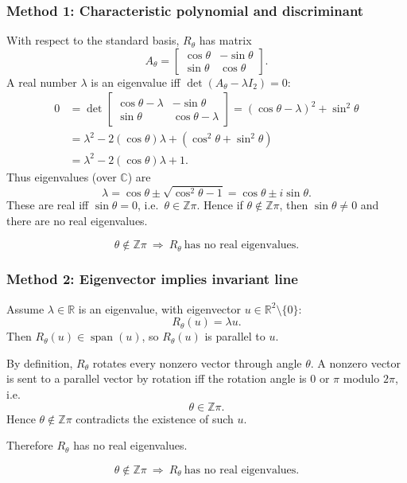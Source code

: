 \documentclass[12pt]{article}
\newcommand{\R}{\mathbb{R}}
\newcommand{\Span}{\operatorname{span}}
\begin{document}
\subsubsection{Method 1: Characteristic polynomial and discriminant}
With respect to the standard basis, $R_{\theta}$ has matrix
\[
A_\theta=
\begin{bmatrix}
\cos\theta & -\sin\theta\\
\sin\theta & \cos\theta
\end{bmatrix}.
\]
A real number $\lambda$ is an eigenvalue iff $\det(A_\theta-\lambda I_2)=0$:
\begin{align*}
0&=\det
\begin{bmatrix}
\cos\theta-\lambda & -\sin\theta\\
\sin\theta & \cos\theta-\lambda
\end{bmatrix}
=(\cos\theta-\lambda)^2+\sin^2\theta\\
&=\lambda^2-2(\cos\theta)\lambda+(\cos^2\theta+\sin^2\theta)\\
&=\lambda^2-2(\cos\theta)\lambda+1.
\end{align*}
Thus eigenvalues (over $\mathbb{C}$) are
\[
\lambda=\cos\theta \pm \sqrt{\cos^2\theta-1}=\cos\theta \pm i\sin\theta.
\]
These are real iff $\sin\theta=0$, i.e.\ $\theta\in\mathbb{Z}\pi$.
Hence if $\theta\notin\mathbb{Z}\pi$, then $\sin\theta\neq 0$ and there are no real eigenvalues.

\[
\boxed{\,\theta\notin\mathbb{Z}\pi\ \Longrightarrow\ R_{\theta}\ \text{has no real eigenvalues.}\,}
\]

\newpage
\subsubsection{Method 2: Eigenvector implies invariant line}

Assume $\lambda\in\R$ is an eigenvalue, with eigenvector $u\in\R^2\setminus\{0\}$:
\[
R_\theta(u)=\lambda u.
\]
Then $R_\theta(u)\in \Span(u)$, so $R_\theta(u)$ is parallel to $u$.

By definition, $R_\theta$ rotates every nonzero vector through angle $\theta$. A nonzero vector is sent to a parallel vector by rotation iff the rotation angle is $0$ or $\pi$ modulo $2\pi$, i.e.
\[
\theta\in\mathbb{Z}\pi.
\]
Hence $\theta\notin\mathbb{Z}\pi$ contradicts the existence of such $u$.

Therefore $R_\theta$ has no real eigenvalues.

\[
\boxed{\,\theta\notin\mathbb{Z}\pi\ \Longrightarrow\ R_{\theta}\ \text{has no real eigenvalues.}\,}
\]
\end{document}
